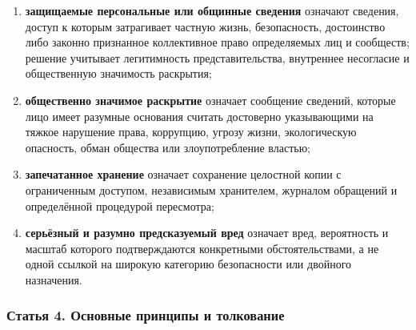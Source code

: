 \documentclass[
  russian,
  11pt,
  a4paper,
]{article}
\begin{document}
\begin{enumerate}
  конкретные, непосредственно применимые и актуальные сведения,
  распространение которых существенно облегчает причинение массового или
  иного тяжкого трансграничного вреда и риск которого нельзя разумно
  снизить менее ограничительным средством;
\item
  \textbf{защищаемые персональные или общинные сведения} означают
  сведения, доступ к которым затрагивает частную жизнь, безопасность,
  достоинство либо законно признанное коллективное право определяемых
  лиц и сообществ; решение учитывает легитимность представительства,
  внутреннее несогласие и общественную значимость раскрытия;
\item
  \textbf{общественно значимое раскрытие} означает сообщение сведений,
  которые лицо имеет разумные основания считать достоверно указывающими
  на тяжкое нарушение права, коррупцию, угрозу жизни, экологическую
  опасность, обман общества или злоупотребление властью;
\item
  \textbf{запечатанное хранение} означает сохранение целостной копии с
  ограниченным доступом, независимым хранителем, журналом обращений и
  определённой процедурой пересмотра;
\item
  \textbf{серьёзный и разумно предсказуемый вред} означает вред,
  вероятность и масштаб которого подтверждаются конкретными
  обстоятельствами, а не одной ссылкой на широкую категорию безопасности
  или двойного назначения.
\end{enumerate}

\subsubsection{Статья 4. Основные принципы и
толкование}\label{ux441ux442ux430ux442ux44cux44f-4-ux43eux441ux43dux43eux432ux43dux44bux435-ux43fux440ux438ux43dux446ux438ux43fux44b-ux438-ux442ux43eux43bux43aux43eux432ux430ux43dux438ux435}
\end{document}
